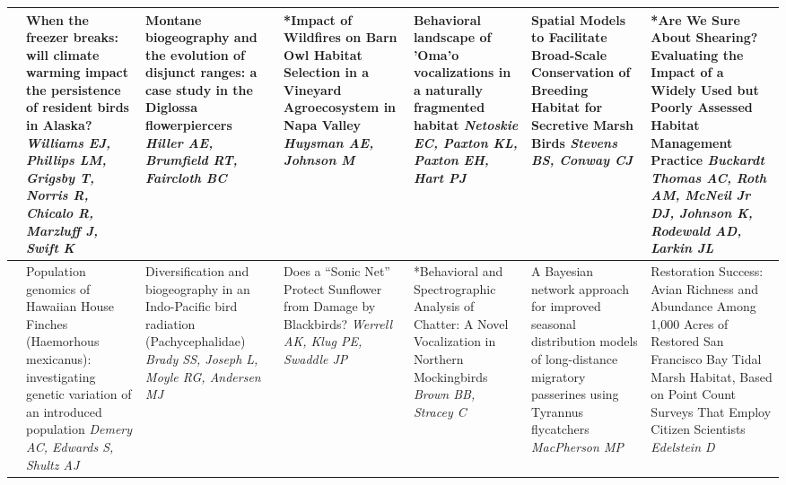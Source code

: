 \begin{tabular}{|x{0.75cm}|x{2.25cm}|x{2.25cm}|x{2.25cm}|x{2.25cm}|x{2.25cm}|x{2.25cm}|}
&When the freezer breaks: will climate warming impact the persistence of resident birds in Alaska? \newline \newline \textit{Williams EJ, Phillips LM, Grigsby T, Norris R, Chicalo R, Marzluff J, Swift K} & Montane biogeography and the evolution of disjunct ranges: a case study in the Diglossa flowerpiercers \newline \newline \textit{Hiller AE, Brumfield RT, Faircloth BC} & *Impact of Wildfires on Barn Owl Habitat Selection in a Vineyard Agroecosystem in Napa Valley \newline \newline \textit{Huysman AE, Johnson M} & Behavioral landscape of 'Oma'o vocalizations in a naturally fragmented habitat \newline \newline \textit{Netoskie EC, Paxton KL, Paxton EH, Hart PJ} & Spatial Models to Facilitate Broad-Scale Conservation of Breeding Habitat for Secretive Marsh Birds \newline \newline \textit{Stevens BS, Conway CJ} & *Are We Sure About Shearing? Evaluating the Impact of a Widely Used but Poorly Assessed Habitat Management Practice \newline \newline \textit{Buckardt Thomas AC, Roth AM, McNeil Jr DJ, Johnson K, Rodewald AD, Larkin JL}\\
\hline
{}&Population genomics of Hawaiian House Finches (Haemorhous mexicanus): investigating genetic variation of an introduced population \newline \newline \textit{Demery AC, Edwards S, Shultz AJ} & Diversification and biogeography in an Indo-Pacific bird radiation (Pachycephalidae) \newline \newline \textit{Brady SS, Joseph L, Moyle RG, Andersen MJ} & Does a “Sonic Net” Protect Sunflower from Damage by Blackbirds? \newline \newline \textit{Werrell AK, Klug PE, Swaddle JP} & *Behavioral and Spectrographic Analysis of Chatter: A Novel Vocalization in Northern Mockingbirds \newline \newline \textit{Brown BB, Stracey C} & A Bayesian network approach for improved seasonal distribution models of long-distance migratory passerines using Tyrannus flycatchers \newline \newline \textit{MacPherson MP} & Restoration Success: Avian Richness and Abundance Among 1,000 Acres of Restored San Francisco Bay Tidal Marsh Habitat, Based on Point Count Surveys That Employ Citizen Scientists \newline \newline \textit{Edelstein D}\\

\end{tabular}
